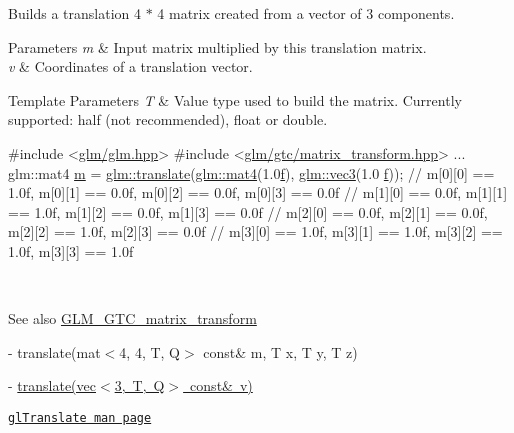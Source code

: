 Builds a translation 4 $\ast$ 4 matrix created from a vector of 3 components.


\begin{DoxyParams}{Parameters}
{\em m} & Input matrix multiplied by this translation matrix. \\
\hline
{\em v} & Coordinates of a translation vector. \\
\hline
\end{DoxyParams}

\begin{DoxyTemplParams}{Template Parameters}
{\em T} & Value type used to build the matrix. Currently supported\+: half (not recommended), float or double. 
\begin{DoxyCode}
\textcolor{preprocessor}{#include <\mbox{\hyperlink{glm_8hpp}{glm/glm.hpp}}>}
\textcolor{preprocessor}{#include <\mbox{\hyperlink{matrix__transform_8hpp}{glm/gtc/matrix\_transform.hpp}}>}
...
glm::mat4 \mbox{\hyperlink{_s_d_l__opengl__glext_8h_af593500c283bf1a787a6f947f503a5c2}{m}} = \mbox{\hyperlink{group__gtc__matrix__transform_ga1a4ecc4ad82652b8fb14dcb087879284}{glm::translate}}(\mbox{\hyperlink{structglm_1_1mat}{glm::mat4}}(1.0\mbox{\hyperlink{_s_d_l__opengl__glext_8h_a691492ec0bd6383f91200e49f6ae40ed}{f}}), \mbox{\hyperlink{structglm_1_1vec}{glm::vec3}}(1.0
      \mbox{\hyperlink{_s_d_l__opengl__glext_8h_a691492ec0bd6383f91200e49f6ae40ed}{f}}));
\textcolor{comment}{// m[0][0] == 1.0f, m[0][1] == 0.0f, m[0][2] == 0.0f, m[0][3] == 0.0f}
\textcolor{comment}{// m[1][0] == 0.0f, m[1][1] == 1.0f, m[1][2] == 0.0f, m[1][3] == 0.0f}
\textcolor{comment}{// m[2][0] == 0.0f, m[2][1] == 0.0f, m[2][2] == 1.0f, m[2][3] == 0.0f}
\textcolor{comment}{// m[3][0] == 1.0f, m[3][1] == 1.0f, m[3][2] == 1.0f, m[3][3] == 1.0f}
\end{DoxyCode}
 \\
\hline
\end{DoxyTemplParams}
\begin{DoxySeeAlso}{See also}
\mbox{\hyperlink{group__gtc__matrix__transform}{G\+L\+M\+\_\+\+G\+T\+C\+\_\+matrix\+\_\+transform}} 

-\/ translate(mat$<$4, 4, T, Q$>$ const\& m, T x, T y, T z) 

-\/ \mbox{\hyperlink{group__gtx__transform_ga309a30e652e58c396e2c3d4db3ee7658}{translate(vec$<$3, T, Q$>$ const\& v)}} 

\href{https://www.khronos.org/registry/OpenGL-Refpages/gl2.1/xhtml/glTranslate.xml}{\tt gl\+Translate man page} 
\end{DoxySeeAlso}
\mbox{\label{group__gtc__matrix__transform_gaaeacc04a2a6f4b18c5899d37e7bb3ef9}} 
